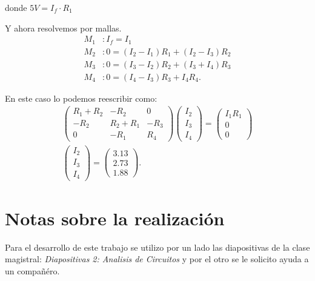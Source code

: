 \documentclass[a4paper, amsfonts, amssymb, amsmath, reprint, showkeys, nofootinbib, twoside]{revtex4-1}
\begin{document}
   donde $5V=I_f\cdot R_1$
   
   Y ahora resolvemos por mallas.
   \begin{align*}
     M_1&: I_f=I_1\\
     M_2&: 0=\left( I_2-I_1 \right) R_1 + \left( I_2-I_3 \right) R_2\\
     M_3&: 0=\left( I_3-I_2 \right) R_2 + \left( I_3+I_4 \right) R_3 \\
     M_4&: 0=\left( I_4-I_3 \right) R_3 + I_4R_4
   .\end{align*}

   En este caso lo podemos reescribir como:
   \begin{align*}
     \begin{pmatrix} R_1+R_2 & -R_2 & 0 \\
       -R_2 & R_2+R_1 & -R_{3}\\
       0 & -R_1 & R_4
     \end{pmatrix} \begin{pmatrix} I_2\\ I_3 \\ I_4 \end{pmatrix} = \begin{pmatrix} I_1R_1 \\ 0 \\ 0 \end{pmatrix} \\
     \begin{pmatrix} I_2\\I_3\\I_4 \end{pmatrix} = \begin{pmatrix} 3.13\\2.73\\1.88 \end{pmatrix} 
   .\end{align*}

   \section{Notas sobre la realización}

   Para el desarrollo de este trabajo se utilizo por un lado las diapositivas de la clase magistral: \textit{Diapositivas 2: Analisis de Circuitos} y por el otro se le solicito ayuda a un compañéro.
\end{document}
